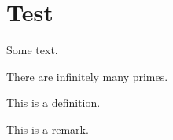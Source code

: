 \chapter{Test}

Some text.

\begin{theorem}
    There are infinitely many primes.
\end{theorem}

\begin{definition}
    This is a definition.
\end{definition}

\begin{remark}
    This is a remark.
\end{remark}